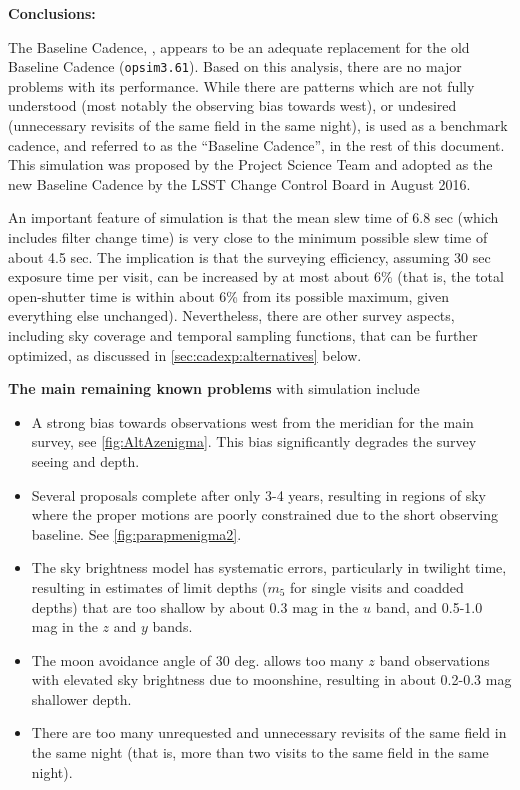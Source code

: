 \vskip 0.2in
{\bf Conclusions:}

The Baseline Cadence, , appears to
be an adequate replacement for the old Baseline Cadence
(\texttt{opsim3.61}). Based on this analysis, there are no
major problems with its performance. While there are patterns which
are not fully understood (most notably the observing bias towards
west),  or undesired (unnecessary revisits of the same field in the
same night),  is used as a benchmark cadence,
and referred to as the ``Baseline Cadence'', in the rest of this
document. This simulation was proposed by the Project Science Team
and adopted as the new Baseline Cadence by the LSST Change Control Board in
August 2016.

An important feature of  simulation is that
the mean slew time of 6.8 sec (which includes filter change time) is
very close to the minimum possible slew time of about 4.5 sec. The
implication is that the surveying efficiency, assuming 30 sec exposure
time per visit, can be increased by at most about 6\% (that is, the
total open-shutter time is within about 6\% from its possible maximum,
given everything else unchanged).  Nevertheless, there are other
survey aspects, including sky coverage and temporal sampling
functions, that can be further optimized, as discussed in
\autoref{sec:cadexp:alternatives} below.

{\bf The main remaining known problems} with  simulation include
\begin{itemize}
\item A strong bias towards observations west from the meridian for
  the main survey, see \autoref{fig:AltAzenigma}.  This bias
  significantly degrades the survey seeing and depth.
\item Several proposals complete after only 3-4 years, resulting in
  regions of sky where the proper motions are poorly constrained due
  to the short observing baseline.  See \autoref{fig:parapmenigma2}.
\item The sky brightness model has systematic errors, particularly in twilight time,
  resulting in estimates of limit depths ($m_5$ for single
  visits and coadded depths) that are too shallow by about 0.3 mag in
  the $u$ band, and 0.5-1.0 mag in the $z$ and $y$ bands.
\item The moon avoidance angle of 30 deg. allows too many $z$ band
  observations with elevated sky brightness due to moonshine,
  resulting in about 0.2-0.3 mag shallower depth.
\item There are too many unrequested and unnecessary revisits of the
  same field in the same night (that is, more than two visits to the
  same field in the same night).
\end{itemize}

